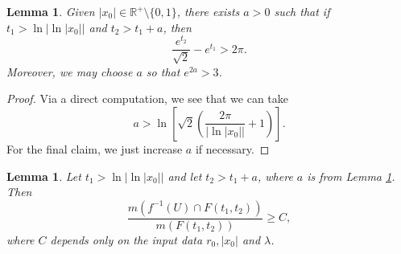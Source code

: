 \documentclass[11pt]{amsart}
\newtheorem{lemma}[theorem]{Lemma}
\numberwithin{equation}{section}
\theoremstyle{definition}
\theoremstyle{definition}
\theoremstyle{definition}
\newcommand{\R}{\mathbb{R}}
\begin{document}
\begin{lemma}
    \label{lem:estimate}
Given $|x_0| \in \R^+ \setminus  \{ 0 ,1 \}$, there exists $a>0$ such that if $t_1 > \ln \left |\ln |x_0| \right |$ and $t_2 > t_1+a$, then 
\[ \frac{e^{t_2}}{\sqrt{2}} - e^{t_1} > 2\pi .\]
Moreover, we may choose $a$ so that $e^{2a}>3$.
\end{lemma}

\begin{proof}
Via a direct computation, we see that we can take
\[ a > \ln \left [ \sqrt{2} \left ( \frac{2\pi}{|\ln|x_0||} + 1 \right ) \right ].\]
For the final claim, we just increase $a$ if necessary.
\end{proof}

\begin{lemma}
\label{lem:doublepreims}
Let $t_1 > \ln \left |\ln |x_0| \right |$ and let $t_2 > t_1+a $, where $a$ is from Lemma \ref{lem:estimate}. Then 
\[ \frac{ m(f^{-1}(U) \cap F(t_1,t_2) ) }{m(F(t_1,t_2))} \geq C,\]
where $C$ depends only on the input data $r_0,|x_0|$ and $\lambda$.
\end{lemma}
\end{document}
